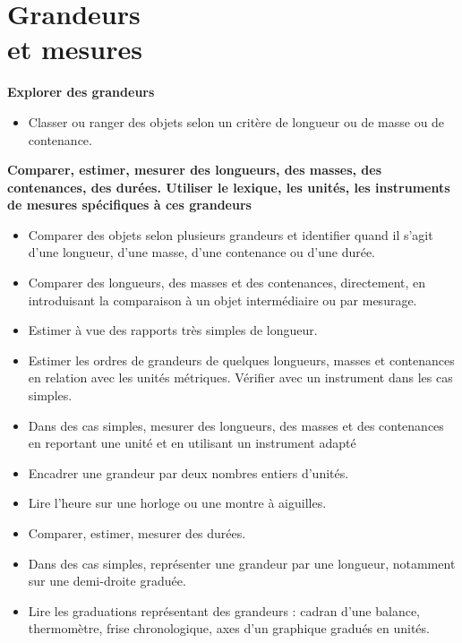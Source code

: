 \chapter{Grandeurs\\et mesures} \label{Grm7}

\begin{prerequis}
{\bf Explorer des grandeurs}
   \begin{itemize}
      \item Classer ou ranger des objets selon un critère de longueur ou de masse ou de contenance.
   \end{itemize}
\end{prerequis}

\begin{prerequis}
      {\bf\small Comparer, estimer, mesurer des longueurs, des masses, des contenances, des durées. Utiliser le lexique, les unités, les instruments de mesures spécifiques à ces grandeurs}
   \begin{itemize}
      \item Comparer des objets selon plusieurs grandeurs et identifier quand il s’agit d’une longueur, d’une masse, d’une contenance ou d’une durée.
      \item Comparer des longueurs, des masses et des contenances, directement, en introduisant la comparaison à un objet intermédiaire ou par mesurage.
      \item Estimer à vue des rapports très simples de longueur.
      \item Estimer les ordres de grandeurs de quelques longueurs, masses et contenances en relation avec les unités métriques. Vérifier avec un instrument dans les cas simples.
      \item Dans des cas simples, mesurer des longueurs, des masses et des contenances en reportant une unité et en utilisant un instrument adapté
      \item Encadrer une grandeur par deux nombres entiers d’unités. 
      \item Lire l’heure sur une horloge ou une montre à aiguilles.
      \item Comparer, estimer, mesurer des durées.
      \item Dans des cas simples, représenter une grandeur par une longueur, notamment sur une demi-droite graduée.
      \item Lire les graduations représentant des grandeurs : cadran d’une balance, thermomètre, frise chronologique, axes d’un graphique gradués en unités.
   \end{itemize}
\end{prerequis}


